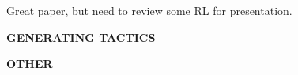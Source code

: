 \documentclass{article}
\begin{document}
Great paper, but need to review some RL for presentation.

\textbf{GENERATING TACTICS}

\cite{LearningToProveITP}
\cite{SEPIA}
\cite{TacticToe}
\cite{LearningToProveTactics}
\cite{GamePad}
\cite{HOList}
\cite{Bridge2014}

\textbf{OTHER}
\cite{GNNsForTP}




\end{document}
